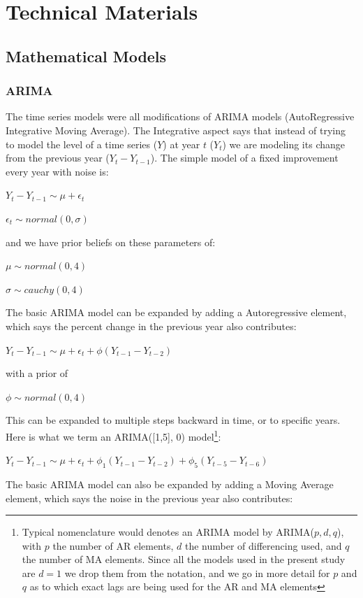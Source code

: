 \documentclass{article}
\begin{document}


\section{Technical Materials}
\subsection{Mathematical Models}
\subsubsection{ARIMA}
The time series models were all modifications of ARIMA models (AutoRegressive Integrative Moving Average). The Integrative aspect says that instead of trying to model the level of a time series ($Y$) at year $t$ ($Y_t$) we are modeling its change from the previous year ($Y_t-Y_{t-1}$). The simple model of a fixed improvement every year with noise is:

$Y_t-Y_{t-1} \sim \mu + \epsilon_t$

$\epsilon_t \sim normal(0, \sigma)$

and we have prior beliefs on these parameters of:

$\mu \sim normal(0,4)$

$\sigma \sim cauchy(0,4)$

The basic ARIMA model can be expanded by adding a Autoregressive element, which says the percent change in the previous year also contributes:

$Y_t-Y_{t-1} \sim \mu + \epsilon_t + \phi (Y_{t-1}-Y_{t-2})$

with a prior of

$\phi \sim normal(0,4)$

This can be expanded to multiple steps backward in time, or to specific years. Here is what we term an ARIMA([1,5], 0) model\footnote{Typical nomenclature would denotes an ARIMA model by ARIMA($p,d,q$), with $p$ the number of AR elements, $d$ the number of differencing used, and $q$ the number of MA elements. Since all the models used in the present study are $d=1$ we drop them from the notation, and we go in more detail for $p$ and $q$ as to which exact lags are being used for the AR and MA elements}:

$Y_t-Y_{t-1} \sim \mu + \epsilon_t + \phi_1 (Y_{t-1}-Y_{t-2}) + \phi_5 (Y_{t-5}-Y_{t-6})$


The basic ARIMA model can also be expanded by adding a Moving Average element, which says the noise in the previous year also contributes:
\end{document}
